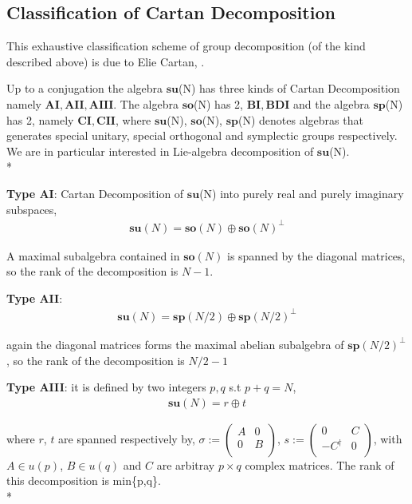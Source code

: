 \documentclass{amsart}
\begin{document}
\subsection*{Classification of Cartan Decomposition}

This exhaustive classification scheme of group decomposition (of the kind described above) is due to Elie Cartan, \cite{Cartan}.

Up to a conjugation the algebra $\mathbf{su}$(N) has three kinds of Cartan Decomposition namely $\mathbf{AI},\mathbf{AII},\mathbf{AIII}$. The algebra $\mathbf{so}$(N) has 2,  $\mathbf{BI},\mathbf{BDI}$ and the algebra $\mathbf{sp}$(N) has 2, namely  $\mathbf{CI},\mathbf{CII}$, where $\mathbf{su}$(N), $\mathbf{so}$(N), $\mathbf{sp}$(N) denotes algebras that generates special unitary, special orthogonal and symplectic groups respectively. We are in particular interested in Lie-algebra decomposition of $\mathbf{su}$(N).\\*


\textbf{Type AI}: Cartan Decomposition of $\mathbf{su}$(N) into purely real and purely imaginary subspaces,
\begin{align}
    \mathbf{su}(N) =\mathbf{so}(N) \oplus \mathbf{so}(N)^{\perp}
\end{align}

A maximal subalgebra contained in $\mathbf{so}(N)$ is spanned by the diagonal matrices, so the rank of the decomposition is $N-1$.

\textbf{Type AII}: 
\begin{align}
    \mathbf{su}(N) =\mathbf{sp}(N/2) \oplus \mathbf{sp}(N/2)^{\perp}
\end{align}

again the diagonal matrices forms the maximal abelian subalgebra of $\mathbf{sp}(N/2)^{\perp}$, so the rank of the decomposition is $N/2-1$

\textbf{Type AIII}: it is defined by two integers $p,q$ s.t $p+q=N$,
\begin{align}
    \mathbf{su}(N) = r \oplus t 
\end{align}

where $r$, $t$ are spanned respectively by, 
$\sigma:=\begin{pmatrix}
 A & 0  \\
 0 & B  \\
\end{pmatrix}$, 
$s:=\begin{pmatrix}
 0 & C  \\
 -C^{\dagger} & 0  \\
\end{pmatrix}$, with $A \in u(p)$, $B \in u(q)$  and $C$ are arbitray $p\times q$ complex matrices. The rank of this decomposition is min\{p,q\}.\\*
\end{document}
